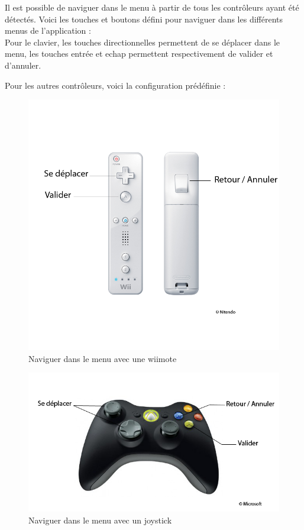 Il est possible de naviguer dans le menu à partir de tous les contrôleurs ayant été détectés.
Voici les touches et boutons défini pour naviguer dans les différents menus de l'application : \\

	Pour le clavier, les touches directionnelles permettent de se déplacer dans le menu, les touches entrée et echap permettent respectivement de valider et d'annuler.
	
	
	Pour les autres contrôleurs, voici la configuration prédéfinie :

\begin{figure}[h]
	\begin{center}
		\includegraphics[scale=0.9]{images/wii_menu.png}
		\caption{Naviguer dans le menu avec une wiimote}
	\end{center}
\end{figure}

\begin{figure}[h]
	\begin{center}
		\includegraphics[scale=0.3]{images/gamepad_menu.png}
		\caption{Naviguer dans le menu avec un joystick}
	\end{center}
\end{figure}

